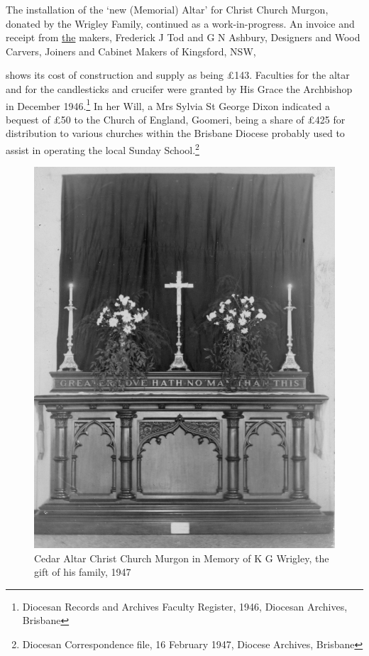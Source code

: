 The installation of the `new (Memorial) Altar' for Christ Church Murgon, donated by the Wrigley Family, continued as a work-in-progress. An invoice and receipt from \underline{the} makers, Frederick J Tod and G N Ashbury, Designers and Wood Carvers, Joiners and Cabinet Makers of Kingsford, NSW,



shows its cost of construction and supply as being \pounds143. Faculties for the altar and for the candlesticks and crucifer were granted by His Grace the Archbishop in December 1946.\footnote{Diocesan Records and Archives Faculty Register, 1946, Diocesan Archives, Brisbane} In her Will, a Mrs Sylvia St George Dixon indicated a bequest of \pounds50 to the Church of England, Goomeri, being a share of \pounds425 for distribution to various churches within the Brisbane Diocese probably used to assist in operating the local Sunday School.\footnote{Diocesan Correspondence file, 16 February 1947, Diocese Archives, Brisbane}








\begin{figure}
\begin{center}
\includegraphics[width=1.\linewidth,center]{../images/cedarAltar1947.jpg}
\caption{Cedar Altar Christ Church Murgon in Memory of K G Wrigley, the gift of his family, 1947}
\end{center}
\end{figure}




